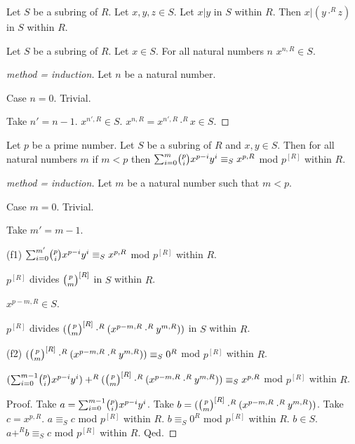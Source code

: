 \documentclass[english,11pt]{article}
\begin{document}
\begin{forthel}

\begin{lemma} Let $S$ be a subring of $R$.
Let $x,y,z \in S$. Let $x | y$ in $S$ within $R$.
Then $x | (y \cdot^{R} z)$ in $S$ within $R$.
\end{lemma}

\begin{lemma} Let $S$ be a subring of $R$.
Let $x \in S$. For all natural numbers $n$
$x^{n,R} \in S$.
\end{lemma}
\begin{proof}[method = induction]
Let $n$ be a natural number.

Case $n=0$. Trivial.

Take $n'=n-1$.
$x^{n',R} \in S$.
$x^{n,R} = x^{n',R} \cdot^{R} x \in S$.
\end{proof}


\begin{lemma} Let $p$ be a prime number.
Let $S$ be a subring of $R$ and $x,y \in S$. 
Then for all natural numbers $m$ if $m < p$ then
$\binsum{m}{p}{x}{y}{R} \equiv_{S} x^{p,R}$ mod $p^{[R]}$ within $R$.
\end{lemma}

\begin{proof}[method = induction]
Let $m$ be a natural number such that $m < p$.

Case $m = 0$. Trivial.

Take $m' = m - 1$.

(f1) $\binsum{m'}{p}{x}{y}{R} \equiv_{S} x^{p,R}$ mod $p^{[R]}$ within $R$.


$p^{[R]}$ divides $\cho{p}{m}^{[R]}$ in $S$ within
$R$.

$x^{p - m,R} \in S$.

$p^{[R]}$ divides $(\cho{p}{m}^{[R]} \cdot^{R} (x^{p - m,R} \cdot^{R} y^{m,R}))$ in $S$ within
$R$.

(f2) $(\cho{p}{m}^{[R]} \cdot^{R} (x^{p - m,R} \cdot^{R} y^{m,R})) \equiv_{S} 0^{R}$ mod $p^{[R]}$ within $R$.




$(\binsum{m-1}{p}{x}{y}{R}) +^{R} (\cho{p}{m}^{[R]} \cdot^{R} (x^{p - m,R} \cdot^{R} y^{m,R}))  
\equiv_{S} x^{p,R}$ mod $p^{[R]}$ within $R$.

Proof.
Take $a = \binsum{m-1}{p}{x}{y}{R}$. 
Take $b = (\cho{p}{m}^{[R]} \cdot^{R} (x^{p - m,R} \cdot^{R} y^{m,R}))$.
Take $c = x^{p,R}$.
$a \equiv_{S} c$ mod $p^{[R]}$ within $R$.
$b \equiv_{S} 0^{R}$ mod $p^{[R]}$ within $R$.
$b \in S$.
$a +^{R} b \equiv_{S} c $ mod $p^{[R]}$ within $R$.
Qed.


\end{proof}
\end{forthel}
\end{document}
